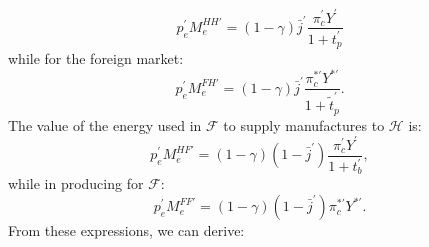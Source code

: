 \documentclass[notitlepage,12pt]{article}
\begin{document}
\begin{equation*}
p_{e}^{\prime }M_{e}^{HH\prime }=\left( 1-\gamma \right) \bar{j}^{\prime
} \frac{\pi _{c}^{\prime }Y^{\prime }}{1+t_{p}^{\prime }}
\end{equation*}%
while for the foreign market:%
\begin{equation*}
p_{e}^{\prime }M_{e}^{FH\prime }=\left( 1-\gamma \right) \bar{j}^{\prime
} \frac{\pi _{c}^{\ast \prime }Y^{\ast \prime }}{1+\tilde{t}_{p}^{\prime
}}.
\end{equation*}%
The value of the energy used in $\mathcal{F}$ to supply manufactures to $%
\mathcal{H}$ is:%
\begin{equation*}
p_{e}^{\prime }M_{e}^{HF\prime }=\left( 1-\gamma \right) \left( 1-\bar{j}%
^{\prime }\right) \frac{\pi _{c}^{\prime }Y^{\prime }}{1+t_{b}^{\prime }%
},
\end{equation*}%
while in producing for $\mathcal{F}$:%
\begin{equation*}
p_{e}^{\prime }M_{e}^{FF\prime }=\left( 1-\gamma \right) \left( 1-\bar{j}%
^{\prime }\right) \pi _{c}^{\ast \prime }Y^{\ast \prime }.
\end{equation*}%
From these expressions, we can derive:
\end{document}
